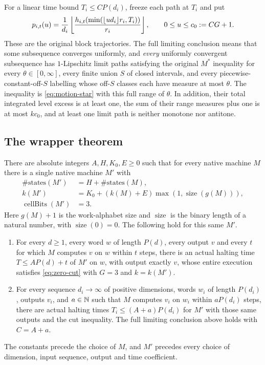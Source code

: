 For a linear time bound $T_i\le CP(d_i)$, freeze each path at $T_i$ and put
\[
 p_{i,t}(u)=\frac{1}{d_i}
  \left\lfloor\frac{h_{i,t}(\min(\lfloor ud_i\rfloor r_i,T_i))}{r_i}\right\rfloor,
 \qquad 0\le u\le c_0:=CG+1.
\]
These are the original block trajectories. The full limiting conclusion means
that some subsequence converges uniformly, and \emph{every} uniformly
convergent subsequence has $1$-Lipschitz limit paths satisfying the original
$M^*$ inequality for every $\theta\in[0,\infty]$, every finite union $S$ of
closed intervals, and every piecewise-constant-off-$S$ labelling whose
off-$S$ classes each have measure at most $\theta$. The inequality is
\eqref{eq:motion-star} with this full range of $\theta$. In addition,
their total integrated level excess is at least one, the sum of their range
measures plus one is at most $kc_0$, and at least one limit path is neither
monotone nor antitone.

\subsection{The wrapper theorem}

\begin{theorem}\label{thm:padding}
There are absolute integers $A,H,K_0,E\ge0$ such that for every native
machine $M$ there is a single native machine $M'$ with
\begin{align*}
 \#\mathrm{states}(M')&=H+\#\mathrm{states}(M),\\
 k(M')&=K_0+(k(M)+E)\max(1,\operatorname{size}(g(M))),\\
 \operatorname{cellBits}(M')&=3.
\end{align*}
Here $g(M)+1$ is the work-alphabet size and $\operatorname{size}$ is the
binary length of a natural number, with $\operatorname{size}(0)=0$.
The following hold for this same $M'$.
\begin{enumerate}[label=(\alph*)]
\item For every $d\ge1$, every word $w$ of length $P(d)$, every output
$v$ and every $t$ for which $M$ computes $v$ on $w$ within $t$ steps, there
is an actual halting time $T\le AP(d)+t$ of $M'$ on $w$, with output exactly
$v$, whose entire execution satisfies \eqref{eq:zero-cut} with $G=3$ and
$k=k(M')$.
\item For every sequence $d_i\to\infty$ of positive dimensions, words
$w_i$ of length $P(d_i)$, outputs $v_i$, and $a\in\mathbb N$ such that $M$ computes
$v_i$ on $w_i$ within $aP(d_i)$ steps, there are actual halting times
$T_i\le(A+a)P(d_i)$ for $M'$ with those same outputs and the cut inequality.
The full limiting conclusion above holds with $C=A+a$.
\end{enumerate}
The constants precede the choice of $M$, and $M'$ precedes every choice of
dimension, input sequence, output and time coefficient.
\end{theorem}


